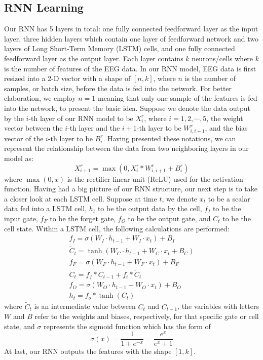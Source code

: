 \subsection{RNN Learning}
Our RNN has 5 layers in total: one fully connected feedforward layer as the input layer, three hidden layers which contain one layer of feedforward network and two layers of Long Short-Term Memory (LSTM) cells, and one fully connected feedforward layer as the output layer. Each layer contains $k$ neurons/cells where $k$ is the number of features of the EEG data. In our RNN model, EEG data is first resized into a 2-D vector with a shape of $[n,k]$, where $n$ is the number of samples, or batch size, before the data is fed into the network. For better elaboration, we employ $n=1$ meaning that only one sample of the features is fed into the network, to present the basic idea. Suppose we denote the data output by the $i$-th layer of our RNN model to be $X_i^{r}$, where $i=1,2,\cdots,5$, the weight vector between the $i$-th layer and the $i+1$-th layer to be $W_{i,i+1}^{r}$, and the bias vector of the $i$-th layer to be $B_{i}^{r}$. Having presented these notations, we can represent the relationship between the data from two neighboring layers in our model as:
\begin{equation}
X_{i+1}^{r} = \max(0, X_i^{r}* W_{i,i+1}^{r} + B_{i}^{r})
\end{equation} 
where $\max(0,x)$ is the rectifier linear unit (ReLU) used for the activation function. Having had a big picture of our RNN structure, our next step is to take a closer look at each LSTM cell. Suppose at time $t$, we denote $x_{t}$ to be a scalar data fed into a LSTM cell, $h_{t}$ to be the output data by the cell, $f_{I}$ to be the input gate, $f_F$ to be the forget gate, $f_O$ to be the output gate, and $C_{t}$ to be the cell state. Within a LSTM cell, the following calculations are performed:
\begin{gather}
f_{I} = \sigma (W_{I}\cdot h_{t-1} + W_{I} \cdot x_{t}) + B_{I}\\
\widetilde{C}_{t} = \tanh(W_{C}\cdot h_{t-1} + W_{C} \cdot x_{t} + B_{C})\\
f_{F} = \sigma (W_{F}\cdot h_{t-1} + W_{F} \cdot x_{t}) + B_{F}\\
C_{t} = f_{f} * C_{t-1} + f_{i} * \widetilde{C}_{t}\\
f_{O} = \sigma (W_{O}\cdot h_{t-1} + W_{O} \cdot x_{t}) + B_{O}\\
h_{t} = f_{o} * \tanh(C_{t})
\end{gather} 
where $\widetilde{C}_{t}$ is an intermediate value between $C_{t}$ and $C_{t-1}$, the variables with letters $W$ and $B$ refer to the weights and biases, respectively, for that specific gate or cell state, and $\sigma$ represents the sigmoid function which has the form of
\begin{equation}
\sigma(x) = \frac{1}{1+e^{-x}} = \frac{e^{x}}{e^{x} + 1}
\end{equation}
At last, our RNN outputs the features with the shape $[1, k]$. 

